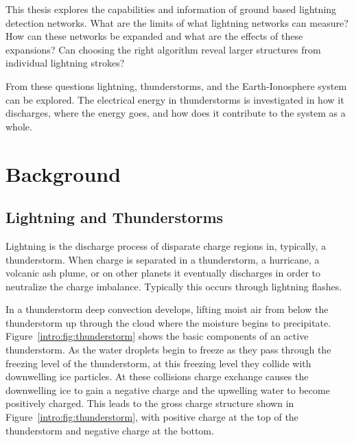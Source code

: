 This thesis explores the capabilities and information of ground based lightning detection networks.
What are the limits of what lightning networks can measure?
How can these networks be expanded and what are the effects of these expansions?
Can choosing the right algorithm reveal larger structures from individual lightning strokes?

From these questions lightning, thunderstorms, and the Earth-Ionosphere system can be explored.
The electrical energy in thunderstorms is investigated in how it discharges, where the energy goes, and how does it contribute to the system as a whole.


\section{Background}

\subsection{Lightning and Thunderstorms}

Lightning is the discharge process of disparate charge regions in, typically, a thunderstorm.
When charge is separated in a thunderstorm, a hurricane, a volcanic ash plume, or on other planets it eventually discharges in order to neutralize the charge imbalance.
Typically this occurs through lightning flashes.

In a thunderstorm deep convection develops, lifting moist air from below the thunderstorm up through the cloud where the moisture begins to precipitate.
Figure~\ref{intro:fig:thunderstorm} shows the basic components of an active thunderstorm.
As the water droplets begin to freeze as they pass through the freezing level of the thunderstorm, at this freezing level they collide with downwelling ice particles.
At these collisions charge exchange causes the downwelling ice to gain a negative charge and the upwelling water to become positively charged.
This leads to the gross charge structure shown in Figure~\ref{intro:fig:thunderstorm}, with positive charge at the top of the thunderstorm and negative charge at the bottom.

